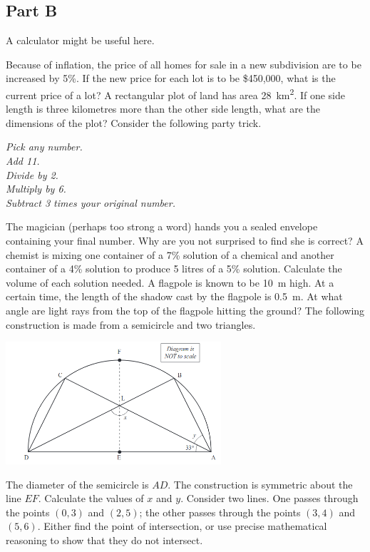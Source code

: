 \subsection*{Part B}
A calculator might be useful here.
\begin{questions}
  \question Because of inflation, the price of all homes for sale in a new subdivision are to be increased by 5\%. If the new price for each lot
            is to be \$450,000, what is the current price of a lot?
  \question A rectangular plot of land has area \SI{28}{\kilo\metre\squared}. If one side length is three kilometres more than the other side
            length, what are the dimensions of the plot?
  \question Consider the following party trick.
            \begin{center}\itshape
              Pick any number.\\
              Add 11.\\
              Divide by 2.\\
              Multiply by 6.\\
              Subtract 3 times your original number.
            \end{center}
            The magician (perhaps too strong a word) hands you a sealed envelope containing your final number. Why are
            you not surprised to find she is correct?
  \question A chemist is mixing one container of a 7\% solution of a chemical and another container of a 4\% solution to
            produce 5 litres of a 5\% solution. Calculate the volume of each solution needed.
  \question A flagpole is known to be \SI{10}{\metre} high. At a certain time, the length of the shadow cast by the flagpole
            is \SI{0.5}{\metre}. At what angle are light rays from the top of the flagpole hitting the ground?
  \question The following construction is made from a semicircle and two triangles.
            \begin{center}
              \includegraphics[width=0.6\textwidth]{semicircle}
            \end{center}
            The diameter of the semicircle is $ AD $. The construction is symmetric about the line $ EF $. Calculate the
            values of $ x $ and $ y $.
  \question Consider two lines. One passes through the points $ (0,3) $ and $ (2,5) $; the other passes through the points $ (3,4) $ and $ (5, 6) $.
            Either find the point of intersection, or use precise mathematical reasoning to show that they do not intersect.
\end{questions}


